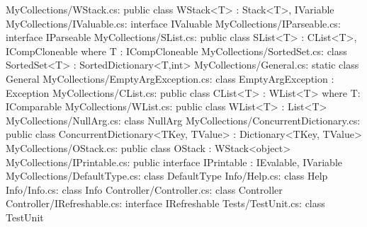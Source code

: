 MyCollections/WStack.cs:	public class WStack<T> : Stack<T>, IVariable 
MyCollections/IValuable.cs:	interface IValuable 
MyCollections/IParseable.cs:	interface IParseable 
MyCollections/SList.cs:	public class SList<T> : CList<T>, ICompCloneable where T : ICompCloneable 
MyCollections/SortedSet.cs:	class SortedSet<T> : SortedDictionary<T,int> 
MyCollections/General.cs:	static class General 
MyCollections/EmptyArgException.cs:	class EmptyArgException : Exception 
MyCollections/CList.cs:	public class CList<T> : WList<T> where T: IComparable 
MyCollections/WList.cs:	public class WList<T> : List<T> 
MyCollections/NullArg.cs:	class NullArg 
MyCollections/ConcurrentDictionary.cs:	public class ConcurrentDictionary<TKey, TValue> : Dictionary<TKey, TValue> 
MyCollections/OStack.cs:	public class OStack : WStack<object> 
MyCollections/IPrintable.cs:	public interface IPrintable : IEvalable, IVariable 
MyCollections/DefaultType.cs:	class DefaultType 
Info/Help.cs:	class Help 
Info/Info.cs:	class Info 
Controller/Controller.cs:	class Controller 
Controller/IRefreshable.cs:	interface IRefreshable 
Tests/TestUnit.cs:	class TestUnit 
